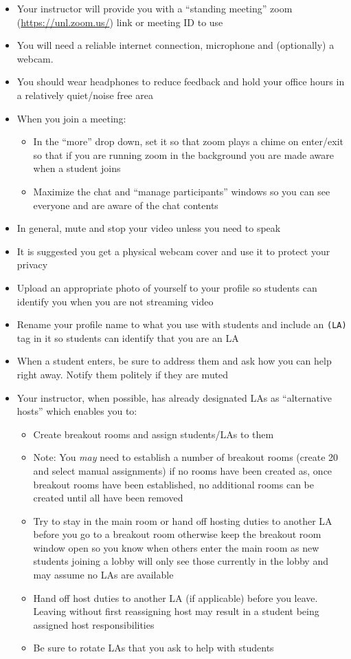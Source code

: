 \documentclass[12pt]{scrartcl}
\begin{document}
\begin{itemize}
  \item Your instructor will provide you with a ``standing meeting'' 
  zoom (\url{https://unl.zoom.us/}) link or meeting ID to use 
  \item You will need a reliable internet connection, microphone and 
  (optionally) a webcam.
  \item You should wear headphones to reduce feedback and hold your 
  office hours in a relatively quiet/noise free area
  \item When you join a meeting:
  \begin{itemize} 
    \item In the ``more'' drop down, set it so that zoom plays a chime on 
    enter/exit so that if you are running zoom in the background you are 
    made aware when a student joins
    \item Maximize the chat and ``manage participants'' windows so you can 
    see everyone and are aware of the chat contents
  \end{itemize}
  \item In general, mute and stop your video unless you need to speak
  \item It is suggested you get a physical webcam cover and use it to protect your privacy
  \item Upload an appropriate photo of yourself to your profile so students can identify you when you are not streaming video
  \item Rename your profile name to what you use with students and include an \texttt{(LA)} tag in it so students can identify that you are an LA 

  \item When a student enters, be sure to address them and ask how you can help right away.  Notify them politely if they are muted
  \item Your instructor, when possible, has already designated LAs as ``alternative hosts'' which enables you to:
  \begin{itemize}
    \item Create breakout rooms and assign students/LAs to them
    \item Note: You \emph{may} need to establish a number of breakout rooms (create 20 and select manual assignments) if no rooms have been created as, once breakout rooms have been established, no additional rooms can be created until all have been removed
    \item Try to stay in the main room or hand off hosting duties to another LA before you go to a breakout room otherwise keep the breakout room window open so you know when others enter the main room as new students joining a lobby will only see those currently in the lobby and may assume no LAs are available
    \item Hand off host duties to another LA (if applicable) before you leave. Leaving without first reassigning host may result in a student being assigned host responsibilities
    \item Be sure to rotate LAs that you ask to help with students
  \end{itemize}
\end{itemize}
\end{document}
